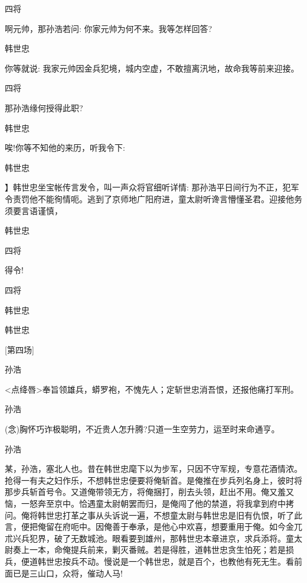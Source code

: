 {{四将}\hspace{30pt}~

啊元帅，那孙浩若问: 你家元帅为何不来。我等怎样回答?

韩世忠

你等就说: 我家元帅因金兵犯境，城内空虚，不敢擅离汛地，故命我等前来迎接。

{四将}\hspace{30pt}~

那孙浩缘何授得此职?

韩世忠\hspace{20pt}~

唉!你等不知他的来历，听我令下: 

{韩世忠

】韩世忠坐宝帐传言发令，叫一声众将官细听详情: 那孙浩平日间行为不正，犯军令责罚他不能徇情呃。逃到了京师地{广阳}府进，童太尉听谗言懵懂圣君。迎接他务须要言语谨慎， }

{韩世忠\hspace{20pt}~


{四将\hspace{30pt}~

得令!}

{四将\hspace{30pt}~

 }

{韩世忠

 }

{韩世忠\hspace{20pt}~

 }

{{[}第四场{]}}

{孙浩

\textless{}点绛唇\textgreater{}奉旨领雄兵，蟒罗袍，不愧先人；定斩世忠消吾恨，还报他痛打军刑。}

{孙浩}

({\akai 念}){胸怀巧诈极聪明，不近贵人怎升腾?只道一生空劳力，运至时来命通亨。}

{孙浩

某，孙浩，塞北人也。昔在韩世忠麾下以为步军，只因不守军规，专意花酒情浓。抢得一有夫之妇作乐，不想韩世忠便要将俺斩首。是俺推在步兵列名身上，彼时将那步兵斩首号令。又道俺带领无方，将俺捆打，削去头领，赶出不用。俺又羞又恼，一怒奔至京中。恰遇童太尉朝罢而归，是俺闯了他的禁道，将我拿到府中拷问。俺将韩世忠打革之事从头诉说一遍，不想童太尉与韩世忠是旧有仇恨，听了此言，便把俺留在府呃中。因俺善于奉承，是他心中欢喜，想要重用于俺。如今金兀朮兴兵犯界，破了无数城池。眼看要到雄州，那韩世忠本章进京，求兵添将。童太尉奏上一本，命俺提兵前来，剿灭番贼。若是得胜，道韩世忠贪生怕死；若是损兵，便道韩世忠按兵不动。慢说是一个韩世忠，就是百个，也教他有死无生。看前面已是三山口，众将，催动人马!}

}}
